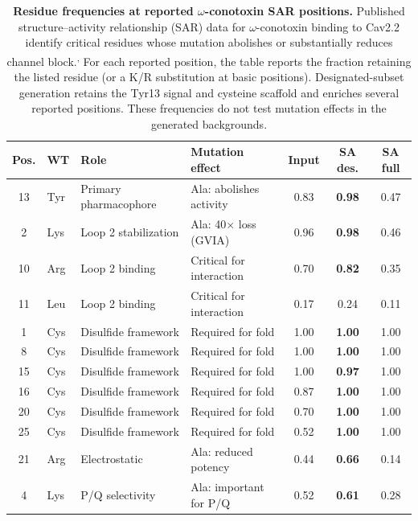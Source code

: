 \documentclass[journal=jcisd8,manuscript=article]{achemso}
\theoremstyle{definition}
\theoremstyle{remark}
\begin{document}
\begin{table}[p]
  \caption{\textbf{Residue frequencies at reported $\omega$-conotoxin SAR positions.}
  Published structure--activity relationship (SAR) data for $\omega$-conotoxin
  binding to Cav2.2 identify critical residues whose mutation abolishes or
  substantially reduces channel block.\cite{kimTyr13Essential1995,satoBasicResidues1993,lewisConotoxinSAR2012}\textsuperscript{,}\cite{satoAlaScanMVIIC2000,schroederLys2Effects2012,schroederChiralityTyr131999}
  For each reported position, the table reports the fraction retaining the listed
  residue (or a K/R substitution at basic positions). Designated-subset generation
  retains the Tyr13 signal and cysteine scaffold and enriches several reported
  positions. These frequencies do not test mutation effects in the generated backgrounds.}
  \label{tab:sar-agreement}
  \centering
  \small
  \begin{tabular}{clllccc}
    \toprule
    Pos. & WT & Role & Mutation effect & Input & SA des. & SA full \\
    \midrule
    13 & Tyr & Primary pharmacophore & Ala: abolishes activity & 0.83 & \textbf{0.98} & 0.47 \\
    2  & Lys & Loop 2 stabilization  & Ala: 40$\times$ loss (GVIA) & 0.96 & \textbf{0.98} & 0.46 \\
    10 & Arg & Loop 2 binding        & Critical for interaction & 0.70 & \textbf{0.82} & 0.35 \\
    11 & Leu & Loop 2 binding        & Critical for interaction & 0.17 & 0.24 & 0.11 \\
    1  & Cys & Disulfide framework   & Required for fold & 1.00 & \textbf{1.00} & 1.00 \\
    8  & Cys & Disulfide framework   & Required for fold & 1.00 & \textbf{1.00} & 1.00 \\
    15 & Cys & Disulfide framework   & Required for fold & 1.00 & \textbf{0.97} & 1.00 \\
    16 & Cys & Disulfide framework   & Required for fold & 0.87 & \textbf{1.00} & 1.00 \\
    20 & Cys & Disulfide framework   & Required for fold & 0.70 & \textbf{1.00} & 1.00 \\
    25 & Cys & Disulfide framework   & Required for fold & 0.52 & \textbf{1.00} & 1.00 \\
    21 & Arg & Electrostatic          & Ala: reduced potency & 0.44 & \textbf{0.66} & 0.14 \\
    4  & Lys & P/Q selectivity       & Ala: important for P/Q & 0.52 & \textbf{0.61} & 0.28 \\
    \bottomrule
  \end{tabular}
\end{table}
\end{document}
